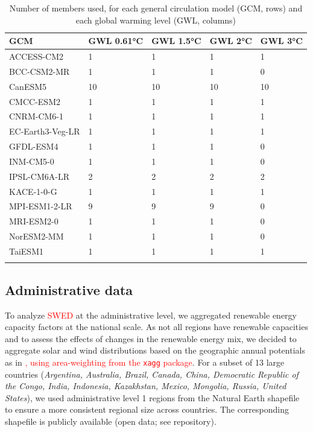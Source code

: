 \documentclass[pdflatex,sn-mathphys-num]{sn-jnl}%
\begin{document}
\begin{table}[h]
\caption{Number of members used, for each general circulation model (GCM, rows) and each global warming level (GWL, columns)}\label{tab1}%
\begin{tabular}{@{}lllll@{}}
\toprule
GCM & GWL 0.61°C  & GWL 1.5°C  & GWL 2°C & GWL 3°C\\
\midrule
ACCESS-CM2 & 1 & 1 & 1 & 1 \\
BCC-CSM2-MR & 1 & 1 & 1 & 0 \\
CanESM5 & 10 & 10 & 10 & 10 \\
CMCC-ESM2 & 1 & 1 & 1 & 1 \\
CNRM-CM6-1 & 1 & 1 & 1 & 1 \\
EC-Earth3-Veg-LR & 1 & 1 & 1 & 1 \\
GFDL-ESM4 & 1 & 1 & 1 & 0 \\
INM-CM5-0 & 1 & 1 & 1 & 0 \\
IPSL-CM6A-LR & 2 & 2 & 2 & 2 \\
KACE-1-0-G & 1 & 1 & 1 & 1 \\
MPI-ESM1-2-LR & 9 & 9 & 9 & 0 \\
MRI-ESM2-0 & 1 & 1 & 1 & 0 \\
NorESM2-MM & 1 & 1 & 1 & 0 \\
TaiESM1 & 1 & 1 & 1 & 1 \\
\botrule
\end{tabular}

\end{table}



\subsection{Administrative data}\label{adm_data}

To analyze \textcolor{red}{SWED} at the administrative level, we aggregated renewable energy capacity factors at the national scale. As not all regions have renewable capacities and to assess the effects of changes in the renewable energy mix, we decided to aggregate solar and wind distributions based on the geographic annual potentials as in \cite{huImplicationsParisproofScenario2023}\textcolor{red}{, using area-weighting from the \texttt{xagg} package}. For a subset of 13 large countries (\textit{Argentina, Australia, Brazil, Canada, China, Democratic Republic of the Congo, India, Indonesia, Kazakhstan, Mexico, Mongolia, Russia, United States}), we used administrative level 1 regions from the Natural Earth shapefile to ensure a more consistent regional size across countries. The corresponding shapefile is publicly available (open data; see repository).
\end{document}
